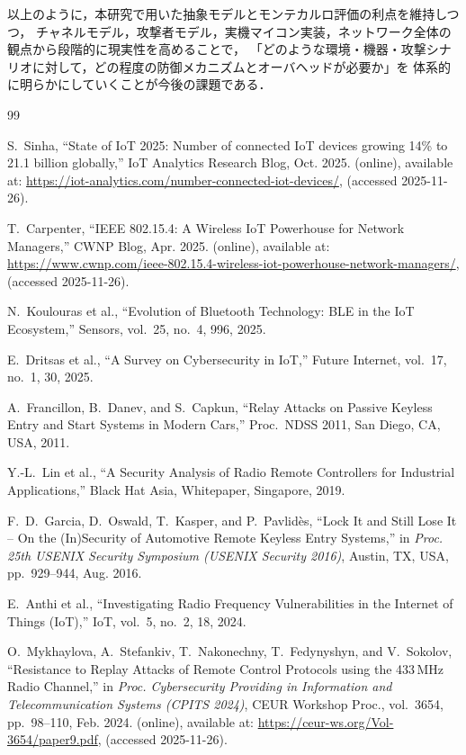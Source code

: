 \documentclass[twocolumn,10pt,a4paper]{jsarticle}
\begin{document}
\vspace{0.5em}
以上のように，本研究で用いた抽象モデルとモンテカルロ評価の利点を維持しつつ，
チャネルモデル，攻撃者モデル，実機マイコン実装，ネットワーク全体の観点から段階的に現実性を高めることで，
「どのような環境・機器・攻撃シナリオに対して，どの程度の防御メカニズムとオーバヘッドが必要か」を
体系的に明らかにしていくことが今後の課題である．

\begin{thebibliography}{99}

S.~Sinha,
``State of IoT 2025: Number of connected IoT devices growing 14\% to 21.1 billion globally,''
IoT Analytics Research Blog, Oct. 2025. (online),
available at: \url{https://iot-analytics.com/number-connected-iot-devices/},
(accessed 2025-11-26).

T.~Carpenter,
``IEEE 802.15.4: A Wireless IoT Powerhouse for Network Managers,''
CWNP Blog, Apr. 2025. (online),
available at: \url{https://www.cwnp.com/ieee-802.15.4-wireless-iot-powerhouse-network-managers/},
(accessed 2025-11-26).

N.~Koulouras et al.,
``Evolution of Bluetooth Technology: BLE in the IoT Ecosystem,''
Sensors, vol.~25, no.~4, 996, 2025.

E.~Dritsas et al.,
``A Survey on Cybersecurity in IoT,''
Future Internet, vol.~17, no.~1, 30, 2025.

A.~Francillon, B.~Danev, and S.~Capkun,
``Relay Attacks on Passive Keyless Entry and Start Systems in Modern Cars,''
Proc.\ NDSS 2011, San Diego, CA, USA, 2011.

Y.-L.~Lin et al.,
``A Security Analysis of Radio Remote Controllers for Industrial Applications,''
Black Hat Asia, Whitepaper, Singapore, 2019.

F.~D.~Garcia, D.~Oswald, T.~Kasper, and P.~Pavlidès,
``Lock It and Still Lose It -- On the (In)Security of Automotive Remote Keyless Entry Systems,''
in \textit{Proc. 25th USENIX Security Symposium (USENIX Security 2016)},
Austin, TX, USA, pp.~929--944, Aug. 2016.

E.~Anthi et al.,
``Investigating Radio Frequency Vulnerabilities in the Internet of Things (IoT),''
IoT, vol.~5, no.~2, 18, 2024.

O.~Mykhaylova, A.~Stefankiv, T.~Nakonechny, T.~Fedynyshyn, and V.~Sokolov,
``Resistance to Replay Attacks of Remote Control Protocols using the 433\,MHz Radio Channel,''
in \textit{Proc. Cybersecurity Providing in Information and Telecommunication Systems (CPITS 2024)},
CEUR Workshop Proc., vol.~3654, pp.~98--110, Feb. 2024.
(online), available at: \url{https://ceur-ws.org/Vol-3654/paper9.pdf},
(accessed 2025-11-26).


\end{thebibliography}
\end{document}
